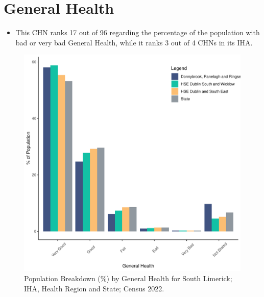 \documentclass{article}
\begin{document}
\pagebreak

\section{General Health}\label{sect:GenHealth}
\begin{itemize}
\item  This CHN ranks  17 out of 96 regarding the percentage of the population with bad or very bad General Health, while it ranks   3 out of 4 CHNs in its IHA.
\end{itemize}
\begin{figure}[h]
	\centering
	\includegraphics[width = 150mm]{../figures/GenED.pdf}
	\caption{Population Breakdown (\%) by General Health for South Limerick; IHA, Health Region and State;  Census 2022.}
	\label{fig:2ae19629-1a6a-13a3-e055-000000000001}
	\end{figure}
\end{document}
